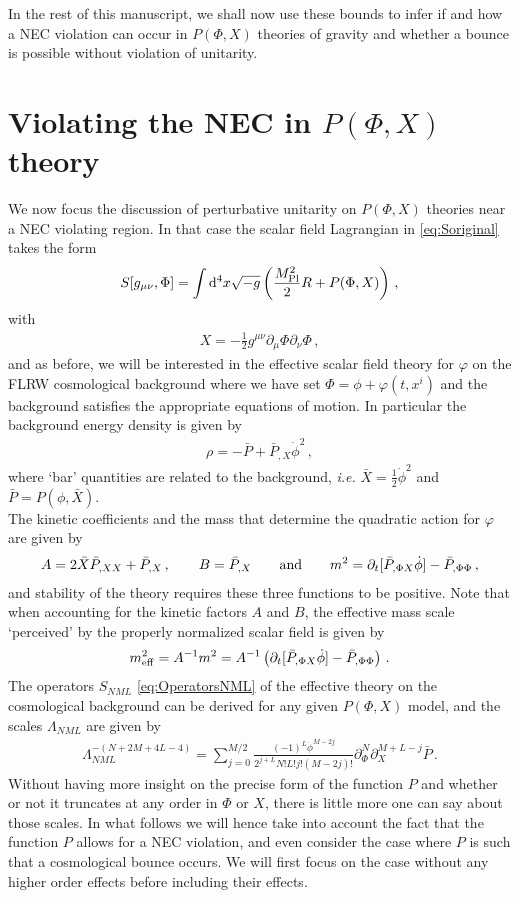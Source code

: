 \documentclass[12pt]{article}
\def\ba{\begin{eqnarray}}
\def\ea{\end{eqnarray}}
\def\mpl{M_{\rm Pl}}
\def\d{\mathrm{d}}
\def\({\left(}
\def\){\right)}
\def\ie{{\it i.e. }}
\def\p{\partial}
\def\mn{_{\mu \nu}}
\def\p{\partial}
\begin{document}
In the rest of this manuscript, we shall now use these bounds to infer if and how a NEC violation can occur in $P(\Phi,X)$ theories of gravity and whether a bounce is possible without violation of unitarity.


\section{Violating the NEC in $P(\Phi,X)$ theory}
\label{sec:PX}

We now focus the discussion of perturbative unitarity on $P(\Phi,X)$ theories near a NEC violating region. In that case the scalar field Lagrangian in \eqref{eq:Soriginal} takes the form
\ba
S[g\mn, \Phi]=\int \d^4 x \sqrt{-g}\(\frac{\mpl^2}{2}R +P(\Phi,X)   \) \,,
\ea
with
\ba
 X=-\frac12 g^{\mu\nu} \p_\mu \Phi \p_\nu \Phi\,,
\ea
and as before, we will be interested in the effective scalar field theory for $\varphi$ on the FLRW cosmological background where we have set $\Phi=\phi+\varphi(t,x^i)$ and the background satisfies the appropriate equations of motion. In particular the background energy density is given by
\ba
\rho=- \bar P + \bar P_{,X} \dot{\phi}^2\,,
\ea
where `bar' quantities are related to the background, \ie $\bar X= \frac12 \dot{\phi}^2$ and $\bar P=P(\phi, \bar X)$. \\

The kinetic coefficients and the mass that determine the quadratic action for $\varphi$ are given by
\ba
A= 2 \bar X \bar P_{, X X}+ \bar P_{, X}\,, \qquad B= \bar P_{, X} \qquad {\rm and }\qquad m^2=\p_t[\bar P_{,\Phi X} \dot{ \phi}]-\bar P_{,\Phi \Phi}\,,
\ea
and stability of the theory requires these three functions to be positive.
Note that when accounting for the kinetic factors $A$ and $B$, the effective mass scale `perceived' by the properly normalized scalar field is  given by
\ba
\label{eq:meff}
m_{\rm eff}^2= A^{-1} m^2 = A^{-1} \(\p_t[\bar P_{,\Phi X} \dot{ \phi}]-\bar P_{,\Phi \Phi}\)\,.
\ea
The operators $S_{NML}$ \eqref{eq:OperatorsNML} of the effective theory on the cosmological background can be derived for any given $P(\Phi,X)$ model, and the scales $\Lambda_{NML}$ are given by
\ba
\label{eq:LambdaNML PX}
\Lambda^{-(N+2M+4L-4)}_{NML} = \sum_{j=0}^{M/2}\frac{(-1)^L \dot{\phi}^{M-2j} }{2^{j+L}N! L! j! (M-2j)!} \p_{\Phi}^N
\p_X^{M+L-j} \bar P\,.
\ea
Without having more insight on the precise form of the function $P$ and whether or not it truncates at any order in $\Phi$ or $X$, there is little more one can say about those scales. In what follows we will hence take into account the fact that the function $P$ allows for a NEC violation, and even consider the case where $P$ is such that a cosmological bounce occurs. We will first focus on the case without any higher order effects before including their effects.
\end{document}
